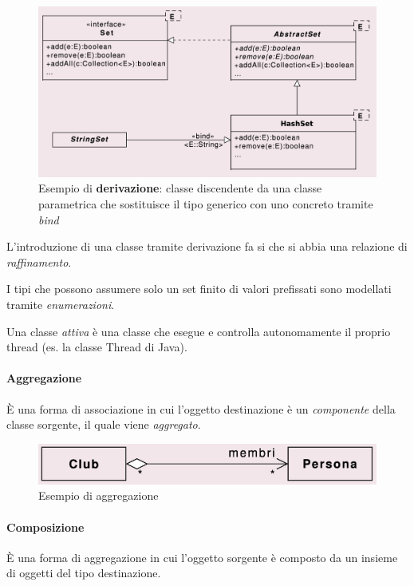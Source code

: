 \begin{figure}[H]
    \centering
    \includegraphics[width=1\linewidth]{assets/UML/class/class-11.png}
    \caption{Esempio di \textbf{derivazione}: classe discendente da una classe parametrica che sostituisce il tipo generico con uno concreto tramite \textit{bind}}
    
\end{figure}
L'introduzione di una classe tramite derivazione fa si che si abbia una relazione di \textit{raffinamento}. 

I tipi che possono assumere solo un set finito di valori prefissati sono modellati tramite \textit{enumerazioni}. 

Una classe \textit{attiva} è una classe che esegue e controlla autonomamente il proprio thread (es. la classe Thread di Java).

\paragraph{Aggregazione} È una forma di associazione in cui l'oggetto destinazione è un \textit{componente} della classe sorgente, il quale viene \textit{aggregato}.

\begin{figure}[H]
    \centering
    \includegraphics[width=1\linewidth]{assets/UML/class/class-6.png}
    \caption{Esempio di aggregazione}
\end{figure}

\paragraph{Composizione} È una forma di aggregazione in cui l'oggetto sorgente è composto da un insieme di oggetti del tipo destinazione.

